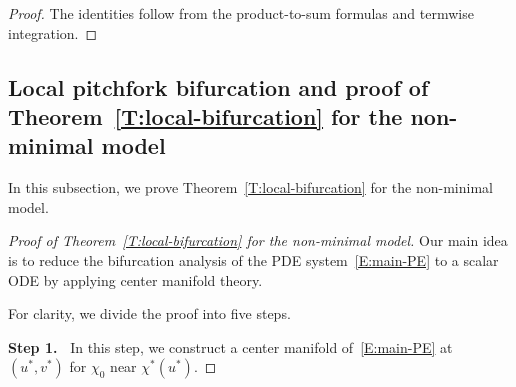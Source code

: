 \documentclass[11pt]{article} %
\theoremstyle{remark}
\theoremstyle{remark}
\numberwithin{equation}{section}
\numberwithin{figure}{section}
\numberwithin{table}{section}
\begin{document}
\begin{proof}
  The identities follow from the product-to-sum formulas and termwise
  integration.
\end{proof}


\subsection{Local pitchfork bifurcation and proof of Theorem~\ref{T:local-bifurcation} for the non-minimal model}
\label{SS:local-bifurcation-proof-1}

In this subsection, we prove Theorem~\ref{T:local-bifurcation} for the
non-minimal model.

\begin{proof}[Proof of Theorem~\ref{T:local-bifurcation}  for the non-minimal model]

  Our main idea is to reduce the bifurcation analysis of the PDE
  system~\eqref{E:main-PE} to a scalar ODE by applying center manifold theory.

  For clarity, we divide the proof into five steps.

  \smallskip

  \noindent\textbf{Step 1.~} In this step, we construct a center manifold
  of~\eqref{E:main-PE} at $(u^*,v^*)$ for $\chi_0$ near $\chi^*(u^*)$.

  \smallskip



\end{proof}
\end{document}
